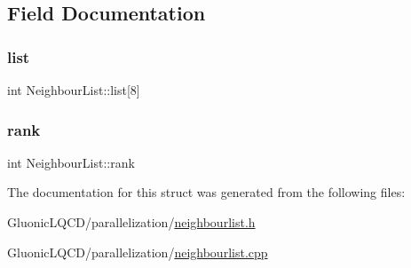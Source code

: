 \subsection{Field Documentation}
\mbox{\label{struct_neighbour_list_ad55e922aabd4ef75711d22c5e5634165}} 
\subsubsection{\texorpdfstring{list}{list}}
{\footnotesize\ttfamily int Neighbour\+List\+::list\mbox{[}8\mbox{]}}

\mbox{\label{struct_neighbour_list_abe10231f4cd3e607e19cea0b0d7aab03}} 
\subsubsection{\texorpdfstring{rank}{rank}}
{\footnotesize\ttfamily int Neighbour\+List\+::rank}



The documentation for this struct was generated from the following files\+:\begin{DoxyCompactItemize}
\item 
Gluonic\+L\+Q\+C\+D/parallelization/\mbox{\hyperlink{neighbourlist_8h}{neighbourlist.\+h}}\item 
Gluonic\+L\+Q\+C\+D/parallelization/\mbox{\hyperlink{neighbourlist_8cpp}{neighbourlist.\+cpp}}\end{DoxyCompactItemize}
